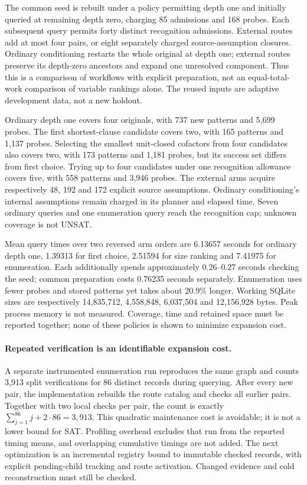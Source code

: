 \documentclass[11pt,a4paper]{article}
\numberwithin{equation}{section}
\theoremstyle{plain}
\theoremstyle{definition}
\theoremstyle{remark}
\begin{document}
The common seed is rebuilt under a policy permitting depth one and initially
queried at remaining depth zero, charging 85 admissions and 168 probes. Each
subsequent query permits forty distinct recognition admissions. External routes
add at most four pairs, or eight separately charged source-assumption closures.
Ordinary conditioning restarts the whole original at depth one; external routes
preserve its depth-zero ancestors and expand one unresolved component. Thus this
is a comparison of workflows with explicit preparation, not an equal-total-work
comparison of variable rankings alone. The reused inputs are adaptive development
data, not a new holdout.

Ordinary depth one covers four originals, with 737 new patterns and 5,699 probes.
The first shortest-clause candidate covers two, with 165 patterns and 1,137 probes.
Selecting the smallest unit-closed cofactors from four candidates also covers two,
with 173 patterns and 1,181 probes, but its success set differs from first choice.
Trying up to four candidates under one recognition allowance covers five, with
558 patterns and 3,946 probes. The external arms acquire respectively 48, 192 and
172 explicit source assumptions. Ordinary conditioning's internal assumptions
remain charged in its planner and elapsed time. Seven ordinary queries and one
enumeration query reach the recognition cap; unknown coverage is not UNSAT.

Mean query times over two reversed arm orders are 6.13657 seconds for ordinary
depth one, 1.39313 for first choice, 2.51594 for size ranking and 7.41975 for
enumeration. Each additionally spends approximately 0.26--0.27 seconds checking
the seed; common preparation costs 0.76235 seconds separately. Enumeration uses
fewer probes and stored patterns yet takes about 20.9\% longer. Working SQLite
sizes are respectively 14,835,712, 4,558,848, 6,037,504 and 12,156,928 bytes.
Peak process memory is not measured. Coverage, time and retained space must be
reported together; none of these policies is shown to minimize expansion cost.

\paragraph{Repeated verification is an identifiable expansion cost.}
A separate instrumented enumeration run reproduces the same graph and counts
3,913 split verifications for 86 distinct records during querying. After every
new pair, the implementation rebuilds the route catalog and checks all earlier
pairs. Together with two local checks per pair, the count is exactly
$\sum_{j=1}^{86}j+2\cdot86=3,913$. This quadratic maintenance cost is avoidable;
it is not a lower bound for SAT. Profiling overhead excludes that run from the
reported timing means, and overlapping cumulative timings are not added.
The next optimization is an incremental registry bound to immutable checked
records, with explicit pending-child tracking and route activation. Changed
evidence and cold reconstruction must still be checked.
\end{document}
